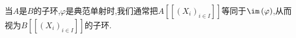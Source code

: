 \begin{remark}{}{}
	当$A$是$B$的子环,$\varphi$是典范单射时,我们通常把$A[[(X_{i})_{i\in I}]]$等同于$\im\left(\varphi\right)$,从而视为$B[[(X_{i})_{i\in I}]]$的子环.
\end{remark}

















































